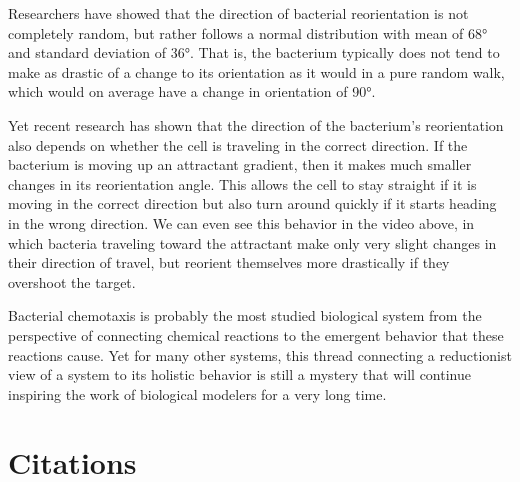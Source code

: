Researchers have showed that the direction of bacterial reorientation is not completely random, but rather follows a normal distribution with mean of 68° and standard deviation of 36°. That is, the bacterium typically does not tend to make as drastic of a change to its orientation as it would in a pure random walk, which would on average have a change in orientation of 90°.

Yet recent research has shown that the direction of the bacterium's reorientation also depends on whether the cell is traveling in the correct direction. If the bacterium is moving up an attractant gradient, then it makes much smaller changes in its reorientation angle. This allows the cell to stay straight if it is moving in the correct direction but also turn around quickly if it starts heading in the wrong direction. We can even see this behavior in the video above, in which bacteria traveling toward the attractant make only very slight changes in their direction of travel, but reorient themselves more drastically if they overshoot the target.

Bacterial chemotaxis is probably the most studied biological system from the perspective of connecting chemical reactions to the emergent behavior that these reactions cause. Yet for many other systems, this thread connecting a reductionist view of a system to its holistic behavior is still a mystery that will continue inspiring the work of biological modelers for a very long time.


\FloatBarrier
{}
\section{Citations}
\citep{Munroe_2014}
\citep{Pierucci_1978}
\citep{Sim_2017}
\citep{Baker_2005}
\citep{Yong_2016}
\citep{Weis_1990, Berg_2000}
\citep{Achouri_2015, Turner_2016, Gotz_1987}
\citep{Li_2004, Spiro_1997, Stock_1991}
\citep{Schwartz_2008}
 \citep{Amin_2010, Terwilliger_1986}
 \citep{Spiro_1997}
 \citep{Spiro_1997}
 
